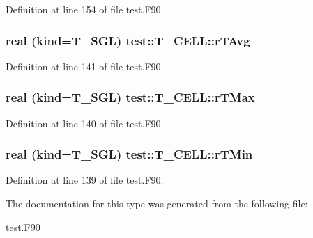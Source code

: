 Definition at line 154 of file test.F90.

\hypertarget{typetest_1_1_t___c_e_l_l_a5a5e54909178e03013819b94cfcab747}{
\subsubsection[{rTAvg}]{\setlength{\rightskip}{0pt plus 5cm}real (kind={\bf T\_\-SGL}) {\bf test::T\_\-CELL::rTAvg}}}
\label{typetest_1_1_t___c_e_l_l_a5a5e54909178e03013819b94cfcab747}


Definition at line 141 of file test.F90.

\hypertarget{typetest_1_1_t___c_e_l_l_aa9a66e60be3aa56c12f7646c937b535e}{
\subsubsection[{rTMax}]{\setlength{\rightskip}{0pt plus 5cm}real (kind={\bf T\_\-SGL}) {\bf test::T\_\-CELL::rTMax}}}
\label{typetest_1_1_t___c_e_l_l_aa9a66e60be3aa56c12f7646c937b535e}


Definition at line 140 of file test.F90.

\hypertarget{typetest_1_1_t___c_e_l_l_a30033b5719a44b95d9bcdafeaa44eb1b}{
\subsubsection[{rTMin}]{\setlength{\rightskip}{0pt plus 5cm}real (kind={\bf T\_\-SGL}) {\bf test::T\_\-CELL::rTMin}}}
\label{typetest_1_1_t___c_e_l_l_a30033b5719a44b95d9bcdafeaa44eb1b}


Definition at line 139 of file test.F90.



The documentation for this type was generated from the following file:\begin{DoxyCompactItemize}
\item 
\hyperlink{test_8_f90}{test.F90}\end{DoxyCompactItemize}
